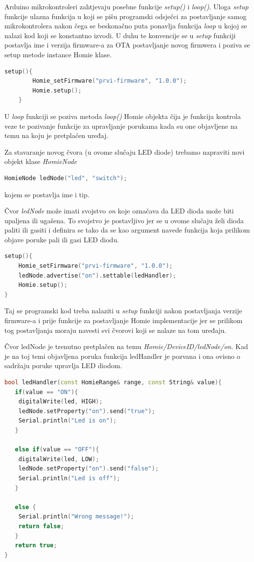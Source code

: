 \documentclass[times, utf8, zavrsni]{fer}
\begin{document}
Arduino mikrokontroleri zahtjevaju posebne funkcije \textit{setup()} i \textit{loop()}.
Uloga \textit{setup} funkcije ulazna funkcija u koji se pišu programski odsječci za postavljanje samog mikrokontrolera nakon čega se beskonačno puta ponavlja funkcija \textit{loop} u kojoj se nalazi kod koji se konstantno izvodi.
U duhu te konvencije se u \textit{setup} funkciji postavlja ime i verzija firmware-a za OTA postavljanje novog firmwera i poziva se setup metode instance Homie klase.
\begin{lstlisting}[language=c++]
    setup(){
        Homie_setFirmware("prvi-firmware", "1.0.0");
        Homie.setup();
    }
\end{lstlisting}

U \textit{loop} funkciji se poziva metoda \textit{loop()} Homie objekta čija je funkcija kontrola veze te pozivanje funkcije za upravljanje porukama kada su one objavljene na temu na koju je pretplaćen uređaj.

Za stavaranje novog čvora (u ovome slučaju LED diode) trebamo napraviti novi objekt klase \textit{HomieNode}
\begin{lstlisting}[language=c++]
HomieNode ledNode("led", "switch");
\end{lstlisting}
kojem se postavlja ime i tip.

Čvor \textit{ledNode} može imati svojstvo \textit{on} koje označava da LED dioda može biti upaljena ili ugašena.
To svojstvo je postavljivo jer se u ovome slučaju želi dioda paliti ili gasiti i definira se tako da se kao argument navede funkcija koja prilikom objave poruke pali ili gasi LED diodu.
\begin{lstlisting}[language=c++]
setup(){
    Homie_setFirmware("prvi-firmware", "1.0.0");
    ledNode.advertise("on").settable(ledHandler);
    Homie.setup();
}
\end{lstlisting}

Taj se programski kod treba nalaziti u \textit{setup} funkciji nakon postavljanja verzije firmware-a i prije funkcije za postavljanje Homie implementacije jer se prilikom tog postavljanja moraju navesti svi čvorovi koji se nalaze na tom uređaju.

Čvor ledNode je trenutno pretplačen na temu \textit{Homie/DeviceID/ledNode/on}.
Kad je na toj temi objavljena poruka funkcija ledHandler je pozvana i ona ovisno o sadržaju poruke upravlja LED diodom.
\begin{lstlisting}[language=C++]
bool ledHandler(const HomieRange& range, const String& value){
   if(value == "ON"){
    digitalWrite(led, HIGH);
    ledNode.setProperty("on").send("true");
    Serial.println("Led is on");
   }

   else if(value == "OFF"){
    digitalWrite(led, LOW);
    ledNode.setProperty("on").send("false");
    Serial.println("Led is off");
   }

   else {
    Serial.println("Wrong message!");
    return false;
   }
   return true;
}
\end{lstlisting}
\end{document}
